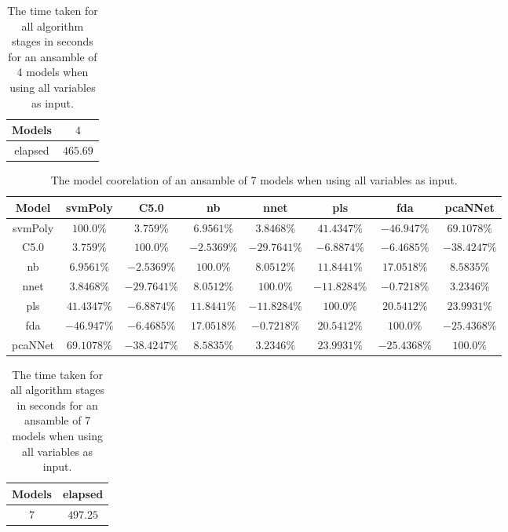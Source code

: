 \begin{table}[!ht]
	\centering
	\begin{tabular}{|c|c|}
		\hline
		Models & $4$ \\ \hline
		elapsed & $465.69$ \\ \hline
	\end{tabular}
	\caption{The time taken for all algorithm stages in seconds for an ansamble of 4 models when using all variables as input.}
	\label{tab:time:ansamble:reverse:all:4}
\end{table}

\begin{table}[!ht]
	\centering
	\begin{tabular}{|c|c|c|c|c|c|c|c|}
		\hline
		Model & svmPoly & C5.0 & nb & nnet & pls & fda & pcaNNet \\ \hline
		svmPoly & $100.0\%$ & $3.759\%$ & $6.9561\%$ & $3.8468\%$ & $41.4347\%$ & $-46.947\%$ & $69.1078\%$ \\ \hline
		C5.0 & $3.759\%$ & $100.0\%$ & $-2.5369\%$ & $-29.7641\%$ & $-6.8874\%$ & $-6.4685\%$ & $-38.4247\%$ \\ \hline
		nb & $6.9561\%$ & $-2.5369\%$ & $100.0\%$ & $8.0512\%$ & $11.8441\%$ & $17.0518\%$ & $8.5835\%$ \\ \hline
		nnet & $3.8468\%$ & $-29.7641\%$ & $8.0512\%$ & $100.0\%$ & $-11.8284\%$ & $-0.7218\%$ & $3.2346\%$ \\ \hline
		pls & $41.4347\%$ & $-6.8874\%$ & $11.8441\%$ & $-11.8284\%$ & $100.0\%$ & $20.5412\%$ & $23.9931\%$ \\ \hline
		fda & $-46.947\%$ & $-6.4685\%$ & $17.0518\%$ & $-0.7218\%$ & $20.5412\%$ & $100.0\%$ & $-25.4368\%$ \\ \hline
		pcaNNet & $69.1078\%$ & $-38.4247\%$ & $8.5835\%$ & $3.2346\%$ & $23.9931\%$ & $-25.4368\%$ & $100.0\%$ \\ \hline
	\end{tabular}
	\caption{The model coorelation of an ansamble of 7 models when using all variables as input.}
	\label{tab:ansamble7:all}
\end{table}

\begin{table}[!ht]
	\centering
	\begin{tabular}{|c|c|}
		\hline
		Models & elapsed \\ \hline
		$7$ & $497.25$ \\ \hline
	\end{tabular}
	\caption{The time taken for all algorithm stages in seconds for an ansamble of 7 models when using all variables as input.}
	\label{tab:time:ansamble:all:7}
\end{table}

